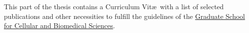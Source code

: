 
\pagestyle{empty}

\hfill

\vfill

This part of the thesis contains a Curriculum Vit\ae\ with a list of selected publications and other necessities to fulfill the guidelines of the \href{http://www.gcb.unibe.ch/content/programme_description/phd_programme/phd_degree/index_eng.html}{Graduate School for Cellular and Biomedical Sciences}.

\vfill



\cleardoublepage